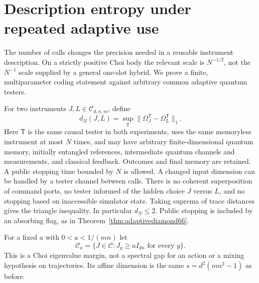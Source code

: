 \section{Description entropy under repeated adaptive use}\label{sec:adaptiveentropy67}
The number of calls changes the precision needed in a reusable
instrument description. On a strictly positive Choi body the relevant
scale is $N^{-1/2}$, not the $N^{-1}$ scale supplied by a general
one-slot hybrid. We prove a finite, multiparameter coding statement
against arbitrary common adaptive quantum testers.

For two instruments $J,L\in\mathcal C_{d,n,m}$, define
\begin{equation}\label{eq:adaptivemetric67}
 d_N(J,L)=\sup_{\mathsf T}
       \|\Omega_J^{\mathsf T}-\Omega_L^{\mathsf T}\|_1.
\end{equation}
Here $\mathsf T$ is the same causal tester in both experiments, uses the
same memoryless instrument at most $N$ times, and may have arbitrary
finite-dimensional quantum memory, initially entangled references,
intermediate quantum channels and measurements, and classical
feedback. Outcomes and final memory are retained. A public stopping
time bounded by $N$ is allowed. A changed input dimension can be handled
by a tester channel between calls. There is no coherent superposition
of command ports, no tester informed of the hidden choice $J$ versus
$L$, and no stopping based on inaccessible simulator state. Taking
suprema of trace distances gives the triangle inequality. In
particular $d_N\le2$. Public stopping is included by an absorbing flag,
as in Theorem~\ref{thm:adaptivediamond66}.

For a fixed $a$ with $0<a<1/(mn)$ let
\[
 \mathcal C_a=\{J\in\mathcal C:J_y\ge aI_{dn}\text{ for every }y\}.
\]
This is a Choi eigenvalue margin, not a spectral gap for an action or a
mixing hypothesis on trajectories. Its affine dimension is the same
$s=d^2(mn^2-1)$ as before.


